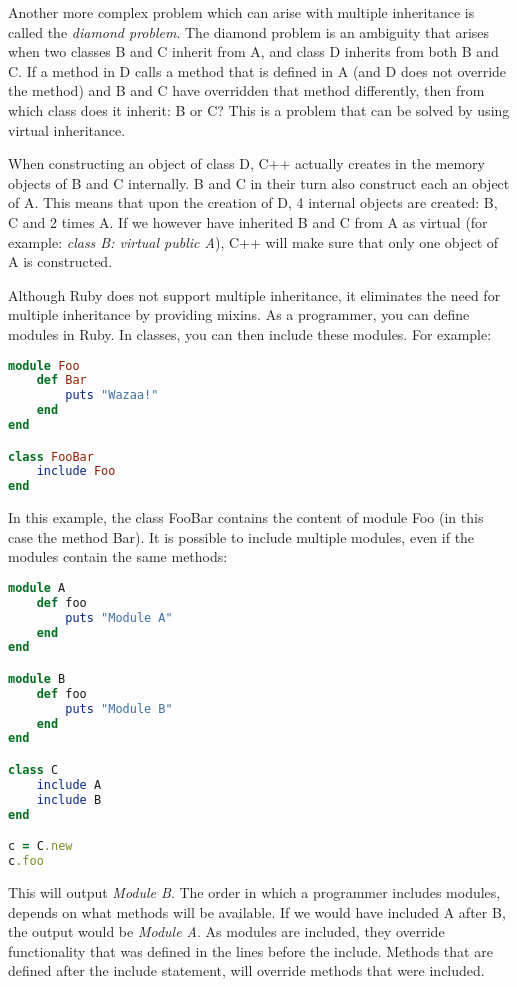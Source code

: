 \documentclass[10pt,a4paper,twocolumn]{article}
\begin{document}
Another more complex problem which can arise with multiple inheritance is called the \textit{diamond problem}. The diamond problem is an ambiguity that arises when two classes B and C inherit from A, and class D inherits from both B and C. If a method in D calls a method that is defined in A (and D does not override the method) and B and C have overridden that method differently, then from which class does it inherit: B or C? This is a problem that can be solved by using virtual inheritance.

When constructing an object of class D, C++ actually creates in the memory objects of B and C internally. B and C in their turn also construct each an object of A. This means that upon the creation of D, 4 internal objects are created: B, C and 2 times A. If we however have inherited B and C from A as virtual (for example: \textit{class B: virtual public A}), C++ will make sure that only one object of A is constructed.

Although Ruby does not support multiple inheritance, it eliminates the need for multiple inheritance by providing mixins. As a programmer, you can define modules in Ruby. In classes, you can then include these modules. For example:

\begin{lstlisting}[language=Ruby]
module Foo
	def Bar
		puts "Wazaa!"
	end
end

class FooBar
	include Foo
end
\end{lstlisting}

In this example, the class FooBar contains the content of module Foo (in this case the method Bar). It is possible to include multiple modules, even if the modules contain the same methods:

\begin{lstlisting}[language=Ruby]
module A
	def foo
		puts "Module A"
	end
end

module B
	def foo
		puts "Module B"
	end
end

class C
	include A
	include B
end

c = C.new
c.foo
\end{lstlisting}

This will output \textit{Module B}. The order in which a programmer includes modules, depends on what methods will be available. If we would have included A after B, the output would be \textit{Module A}. As modules are included, they override functionality that was defined in the lines before the include. Methods that are defined after the include statement, will override methods that were included.
\end{document}
